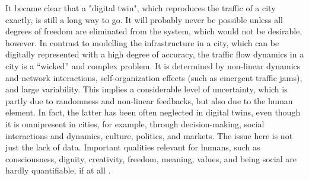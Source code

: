 It became clear that a "digital twin", which reproduces the traffic of a city exactly, is still a long way to go. It will probably never be possible unless all degrees of freedom are eliminated from the system, which would not be desirable, however. In contrast to modelling the infrastructure in a city, which can be digitally represented with a high degree of accuracy, the traffic flow dynamics in a city is a “wicked” and complex problem. It is determined by non-linear dynamics and network interactions, self-organization effects (such as emergent traffic jams), and large variability. This implies a considerable level of uncertainty, which is partly due to randomness and non-linear feedbacks, but also due to the human element. In fact, the latter has been often neglected in digital twins, even though it is omnipresent in cities, for example, through decision-making, social interactions and dynamics, culture, politics, and markets. The issue here is not just the lack of data. Important qualities relevant for humans, such as consciousness, dignity, creativity, freedom, meaning, values, and being social are hardly quantifiable, if at all \citep{Helbing2021}.

